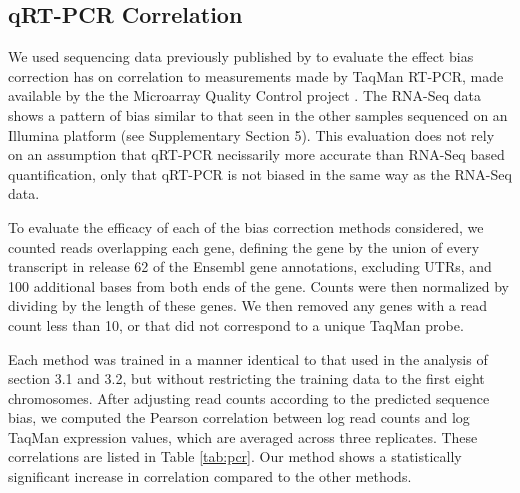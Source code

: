 \documentclass{bioinfo}
\begin{document}
\subsection{qRT-PCR Correlation}

We used sequencing data previously published by \citet{Au2010} to evaluate the
effect bias correction has on correlation to measurements made by TaqMan RT-PCR,
made available by the the Microarray Quality Control project \citep{Shi2006}. The
RNA-Seq data shows a pattern of bias similar to that seen in the other samples
sequenced on an Illumina platform (see Supplementary Section 5). This evaluation
does not rely on an assumption that qRT-PCR necissarily more accurate than
RNA-Seq based quantification, only that qRT-PCR is not biased in the same way as
the RNA-Seq data.

To evaluate the efficacy of each of the bias correction methods considered, we
counted reads overlapping each gene, defining the gene by the union of every
transcript in release 62 of the Ensembl gene annotations, excluding UTRs, and
100 additional bases from both ends of the gene. Counts were then normalized by
dividing by the length of these genes. We then removed any genes with a read
count less than 10, or that did not correspond to a unique TaqMan probe.

Each method was trained in a manner identical to that used in the analysis of
section 3.1 and 3.2, but without restricting the training data to the first
eight chromosomes.  After adjusting read counts according to the predicted
sequence bias, we computed the Pearson correlation between log read counts and
log TaqMan expression values, which are averaged across three replicates. These
correlations are listed in Table \ref{tab:pcr}. Our method shows a statistically
significant increase in correlation compared to the other methods.
\end{document}
